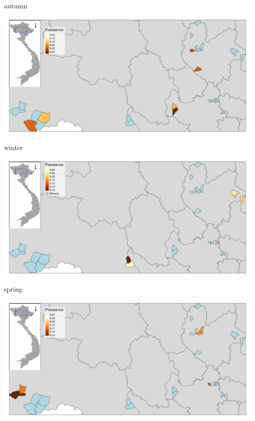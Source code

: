 \begin{frame}
autumn\\
\begin{center}
\includegraphics[width=1\textwidth]{map05_autumn.pdf}
\end{center}
\end{frame}

\begin{frame}
winter\\
\begin{center}
\includegraphics[width=1\textwidth]{map05_winter.pdf}
\end{center}
\end{frame}


\begin{frame}
spring\\
\begin{center}
\includegraphics[width=1\textwidth]{map05_spring.pdf}
\end{center}
\end{frame}


